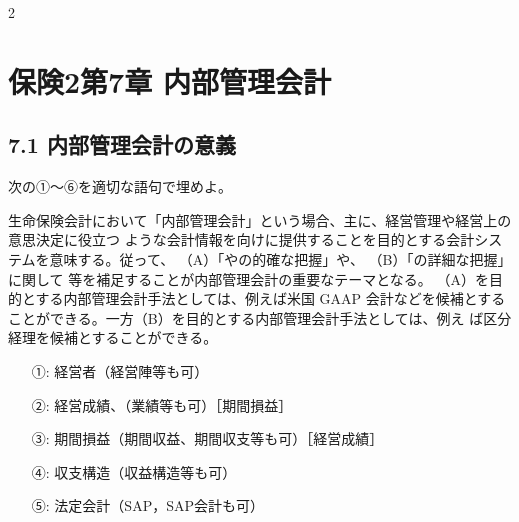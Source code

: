 2\documentclass[report,gutter=10mm,fore-edge=10mm,uplatex,dvipdfmx]{jlreq}
\begin{document}
\chapter{保険2第7章 内部管理会計}
\section{7.1 内部管理会計の意義}
次の①～⑥を適切な語句で埋めよ。

生命保険会計において「内部管理会計」という場合、主に、経営管理や経営上の意思決定に役立つ
ような会計情報を向けに提供することを目的とする会計システムを意味する。従って、
（A）「やの的確な把握」や、
（B）「の詳細な把握」に関して
等を補足することが内部管理会計の重要なテーマとなる。
（A）を目的とする内部管理会計手法としては、例えば米国
GAAP 会計などを候補とすることができる。一方（B）を目的とする内部管理会計手法としては、例え
ば区分経理を候補とすることができる。
\answer{}
\begin{itemize}
\item[ ①: ] 経営者（経営陣等も可）
\item[ ②: ] 経営成績、（業績等も可）［期間損益］
\item[ ③: ] 期間損益（期間収益、期間収支等も可）［経営成績］
\item[ ④: ] 収支構造（収益構造等も可）
\item[ ⑤: ] 法定会計（SAP，SAP会計も可）
\end{itemize}
\end{document}
